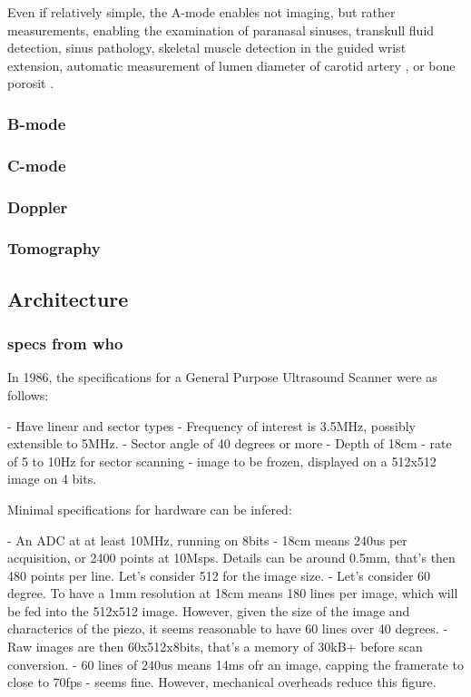 \documentclass[conference]{IEEEtran}
\begin{document}
Even if relatively simple, the A-mode enables not imaging, but rather measurements, enabling the examination of paranasal sinuses, transkull fluid detection, sinus pathology, skeletal muscle detection in the guided wrist extension, automatic measurement of lumen diameter of carotid artery \cite{li_new_2014}, or bone porosit \cite{wahab_design_2016}.


\subsubsection{B-mode}

\subsubsection{C-mode}

\subsubsection{Doppler}

\subsubsection{Tomography}

\cite{kuzmin_fast_2016}

\subsection{Architecture}

\subsubsection{specs from who}



\cite{kurjak_use_1986}


In 1986, the specifications for a General Purpose Ultrasound Scanner were as follows:

- Have linear and sector types
- Frequency of interest is 3.5MHz, possibly extensible to 5MHz.
- Sector angle of 40 degrees or more
- Depth of 18cm
- rate of 5 to 10Hz for sector scanning
- image to be frozen, displayed on a 512x512 image on 4 bits.

Minimal specifications for hardware can be infered:

- An ADC at at least 10MHz, running on 8bits
- 18cm means 240us per acquisition, or 2400 points at 10Msps. Details can be around 0.5mm, that's then  480 points per line. Let's consider 512 for the image size.
- Let's consider 60 degree. To have a 1mm resolution at 18cm means 180 lines per image, which will be fed into the 512x512 image. However, given the size of the image and characterics of the piezo, it seems reasonable to have 60 lines over 40 degrees.
- Raw images are then 60x512x8bits, that's a memory of 30kB+ before scan conversion.
- 60 lines of 240us means 14ms ofr an image, capping the framerate to close to 70fps - seems fine. However, mechanical overheads reduce this figure.
\end{document}
